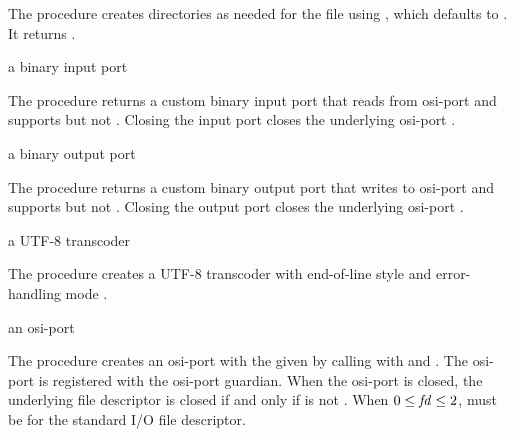 The  procedure creates directories as needed
for the file  using , which defaults to
. It returns .

\begin{procedure}
\end{procedure}
\returns{} a binary input port

The  procedure returns a custom binary input
port that reads from osi-port  and supports
 but not . Closing the
input port closes the underlying osi-port .

\begin{procedure}
\end{procedure}
\returns{} a binary output port

The  procedure returns a custom binary
output port that writes to osi-port  and supports
 but not . Closing the
output port closes the underlying osi-port .

\begin{procedure}
\end{procedure}
\returns{} a UTF-8 transcoder

The  procedure creates a UTF-8 transcoder
with end-of-line style  and error-handling mode
.

\begin{procedure}
\end{procedure}
\returns{} an osi-port

The  procedure creates an osi-port with the given
 by calling  with  and
. The osi-port is registered with the osi-port
guardian. When the osi-port is closed, the
underlying file descriptor  is closed if and only if
 is not . When $0 \le \var{fd} \le 2$,
 must be  for the standard I/O file descriptor.

